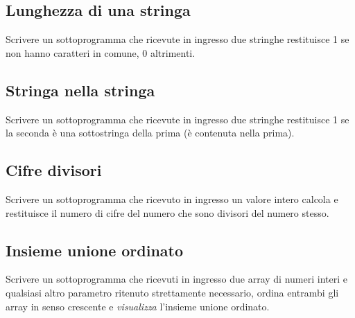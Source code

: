 \subsection{Lunghezza di una stringa}
Scrivere un sottoprogramma che ricevute in ingresso due stringhe restituisce 1 se non hanno caratteri in comune, 0 altrimenti.


\subsection{Stringa nella stringa}
Scrivere un sottoprogramma che ricevute in ingresso due stringhe restituisce 1 se la seconda \`e una sottostringa della prima (\`e contenuta nella prima).


\subsection{Cifre divisori}
Scrivere un sottoprogramma che ricevuto in ingresso un valore intero calcola e restituisce il numero di cifre del numero che sono divisori del numero stesso.


\subsection{Insieme unione ordinato}
Scrivere un sottoprogramma che ricevuti in ingresso due array di numeri interi e qualsiasi altro parametro ritenuto strettamente necessario, ordina entrambi gli array in senso crescente e \textit{visualizza} l'insieme unione ordinato.



